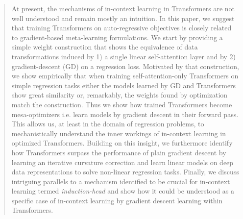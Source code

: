 \documentclass{article}
\theoremstyle{plain}
\theoremstyle{definition}
\theoremstyle{remark}
\begin{document}

\printAffiliationsAndNotice{}  

\begin{abstract}

At present, the mechanisms of in-context learning in Transformers are not well understood and remain mostly an intuition. In this paper, we suggest that training Transformers on auto-regressive objectives is closely related to gradient-based meta-learning formulations. We start by providing a simple weight construction that shows the equivalence of data transformations induced by 1) a single linear self-attention layer and by 2) gradient-descent (GD) on a regression loss. Motivated by that construction, we show empirically that when training self-attention-only Transformers on simple regression tasks either the models learned by GD and Transformers show great similarity or, remarkably, the weights found by optimization match the construction. Thus we show how trained Transformers become mesa-optimizers i.e. learn models by gradient descent in their forward pass. This allows us, at least in the domain of regression problems, to mechanistically understand the inner workings of in-context learning in optimized Transformers. Building on this insight, we furthermore identify how Transformers surpass the performance of plain gradient descent by learning an iterative curvature correction and learn linear models on deep data representations to solve non-linear regression tasks. Finally, we discuss intriguing parallels to a mechanism identified to be crucial for in-context learning termed \textit{induction-head} \citep{induction_heads} and show how it could be understood as a specific case of in-context learning by gradient descent learning within Transformers.
\end{abstract}
\end{document}
